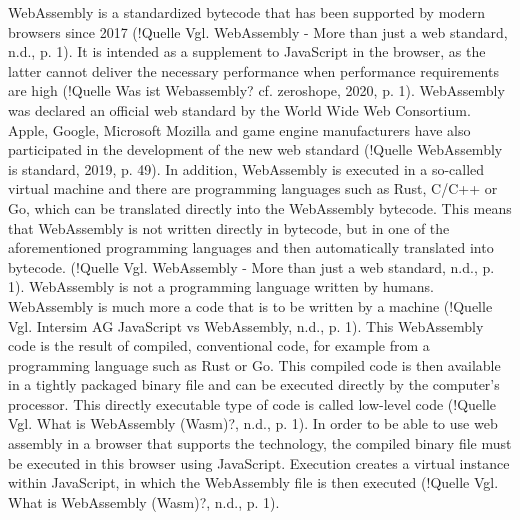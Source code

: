 WebAssembly is a standardized bytecode that has been supported by modern browsers since 2017 (!Quelle Vgl. WebAssembly - More than just a web standard, n.d., p. 1). It is intended as a supplement to JavaScript in the browser, as the latter cannot deliver the necessary performance when performance requirements are high (!Quelle Was ist Webassembly? cf. zeroshope, 2020, p. 1).
WebAssembly was declared an official web standard by the World Wide Web Consortium. Apple, Google, Microsoft Mozilla and game engine manufacturers have also participated in the development of the new web standard (!Quelle WebAssembly is standard, 2019, p. 49).
In addition, WebAssembly is executed in a so-called virtual machine and there are programming languages such as Rust, C/C++ or Go, which can be translated directly into the WebAssembly bytecode. This means that WebAssembly is not written directly in bytecode, but in one of the aforementioned programming languages and then automatically translated into bytecode. (!Quelle Vgl. WebAssembly - More than just a web standard, n.d., p. 1).
WebAssembly is not a programming language written by humans. WebAssembly is much more a code that is to be written by a machine (!Quelle Vgl. Intersim AG JavaScript vs WebAssembly, n.d., p. 1). This WebAssembly code is the result of compiled, conventional code, for example from a programming language such as Rust or Go. This compiled code is then available in a tightly packaged binary file and can be executed directly by the computer's processor. This directly executable type of code is called low-level code (!Quelle Vgl. What is WebAssembly (Wasm)?, n.d., p. 1).
In order to be able to use web assembly in a browser that supports the technology, the compiled binary file must be executed in this browser using JavaScript. Execution creates a virtual instance within JavaScript, in which the WebAssembly file is then executed (!Quelle Vgl. What is WebAssembly (Wasm)?, n.d., p. 1).
